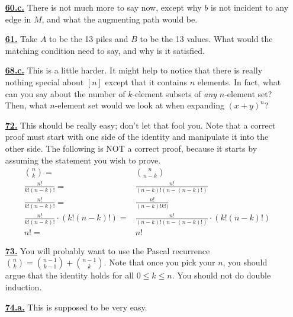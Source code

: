 \documentclass[10pt,]{book}
\theoremstyle{plain}
\theoremstyle{definition}
\theoremstyle{definition}
\theoremstyle{definition}
\numberwithin{equation}{chapter}
\newcommand{\amp}{&}
\begin{document}
\begin{itemize}[itemsep=1em]
\hypertarget{a-60.c}{}\item[\textbf{\hyperref[task-67]{60.c.}}]
\hypertarget{p-459}{}%
There is not much more to say now, except why \(b\) is not incident to any edge in \(M\), and what the augmenting path would be.%

\hypertarget{a-61}{}\item[\textbf{\hyperref[activity-54]{61.}}]
\hypertarget{p-462}{}%
Take \(A\) to be the 13 piles and \(B\) to be the 13 values.  What would the matching condition need to say, and why is it satisfied.%

\hypertarget{a-68.c}{}\item[\textbf{\hyperref[task-92]{68.c.}}]
\hypertarget{p-513}{}%
This is a little harder.  It might help to notice that there is really nothing special about \([n]\) except that it contains \(n\) elements.  In fact, what can you say about the number of \(k\)-element subsets of \emph{any} \(n\)-element set?  Then, what \(n\)-element set would we look at when expanding \((x+y)^n\)?%

\hypertarget{a-72}{}\item[\textbf{\hyperref[activity-65]{72.}}]
\hypertarget{p-556}{}%
This should be really easy; don't let that fool you.  Note that a correct proof must start with one side of the identity and manipulate it into the other side.  The following is NOT a correct proof, because it starts by assuming the statement you wish to prove.%
\begin{align*}
\binom{n}{k}  = \amp \binom{n}{n-k}\\
\frac{n!}{k!(n-k)!} =  \amp \frac{n!}{(n-k)!(n-(n-k)!)}\\
\frac{n!}{k!(n-k)!} =  \amp \frac{n!}{(n-k)!k!)}\\
\frac{n!}{k!(n-k)!} \cdot (k!(n-k)!)=  \amp \frac{n!}{(n-k)!(n-(n-k)!)}\cdot(k!(n-k)!)\\
n! =  \amp n!
\end{align*}
%

\hypertarget{a-73}{}\item[\textbf{\hyperref[activity-66]{73.}}]
\hypertarget{p-559}{}%
You will probably want to use the Pascal recurrence \(\binom{n}{k} = \binom{n-1}{k-1} + \binom{n-1}{k}\).  Note that once you pick your \(n\), you should argue that the identity holds for all \(0 \le k \le n\).  You should not do double induction.%

\hypertarget{a-74.a}{}\item[\textbf{\hyperref[task-104]{74.a.}}]
\hypertarget{p-562}{}%
This is supposed to be very easy.%


\end{itemize}
\end{document}
